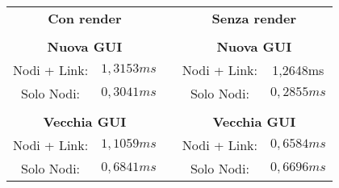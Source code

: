 
\begin{tabular}{ccccc}
    \multicolumn{2}{c}{\textbf{Con render}} &  & \multicolumn{2}{c}{\textbf{Senza render}} \\
     &  &  &  &  \\ \cline{1-2} \cline{4-5}
    \multicolumn{2}{|c|}{\textbf{Nuova GUI}} & \multicolumn{1}{c|}{} & \multicolumn{2}{c|}{\textbf{Nuova GUI}} \\ \cline{1-2} \cline{4-5}
    \multicolumn{1}{|c|}{Nodi + Link:} & \multicolumn{1}{c|}{$1,3153ms$} & \multicolumn{1}{c|}{} & \multicolumn{1}{c|}{Nodi + Link:} & \multicolumn{1}{c|}{1,2648ms} \\ \cline{1-2} \cline{4-5}
    \multicolumn{1}{|c|}{Solo Nodi:} & \multicolumn{1}{c|}{$0,3041ms$} & \multicolumn{1}{c|}{} & \multicolumn{1}{c|}{Solo Nodi:} & \multicolumn{1}{c|}{$0,2855ms$} \\ \cline{1-2} \cline{4-5}
     &  &  &  &  \\ \cline{1-2} \cline{4-5}
    \multicolumn{2}{|c|}{\textbf{Vecchia GUI}} & \multicolumn{1}{c|}{} & \multicolumn{2}{c|}{\textbf{Vecchia GUI}} \\ \cline{1-2} \cline{4-5}
    \multicolumn{1}{|c|}{Nodi + Link:} & \multicolumn{1}{c|}{$1,1059ms$} & \multicolumn{1}{c|}{} & \multicolumn{1}{c|}{Nodi + Link:} & \multicolumn{1}{c|}{$0,6584ms$} \\ \cline{1-2} \cline{4-5}
    \multicolumn{1}{|c|}{Solo Nodi:} & \multicolumn{1}{c|}{$0,6841ms$} & \multicolumn{1}{c|}{} & \multicolumn{1}{c|}{Solo Nodi:} & \multicolumn{1}{c|}{$0,6696ms$} \\ \cline{1-2} \cline{4-5}
\end{tabular}
